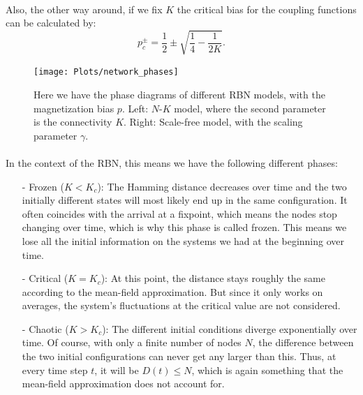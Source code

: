 \paragraph*{}
Also, the other way around, if we fix $ K $ the critical bias for the coupling functions can be calculated by:
\begin{equation}\label{eq:critical_magnetization_bias}
p_c^{\pm}=\frac{1}{2}\pm \sqrt{\frac{1}{4}-\frac{1}{2K}}.
\end{equation}

\begin{figure}
	\texttt{[image: Plots/network\_phases]}
	\caption{Here we have the phase diagrams of different RBN models, with the magnetization bias $p$. Left: $N$-$K$ model, where the second parameter is the connectivity $K$. Right: Scale-free model, with the scaling parameter $\gamma$. }
	\label{fig:network_phases}
\end{figure}


\paragraph{}
In the context of the RBN, this means we have the following different phases:
\begin{itemize}
	\item[-] Frozen ($K<K_c$): The Hamming distance decreases over time and the two initially different states will most likely end up in the same configuration. It often coincides with the arrival at a fixpoint, which means the nodes stop changing over time, which is why this phase is called frozen. This means we lose all the initial information on the systems we had at the beginning over time.
	\item[-] Critical ($K=K_c$): At this point, the distance stays roughly the same according to the mean-field approximation. But since it only works on averages, the system's fluctuations at the critical value are not considered.
	\item[-] Chaotic ($K>K_c$): The different initial conditions diverge exponentially over time. Of course, with only a finite number of nodes $ N $, the difference between the two initial configurations can never get any larger than this. Thus, at every time step $t$, it will be $D(t) \leq N $, which is again something that the mean-field approximation does not account for.
\end{itemize}

